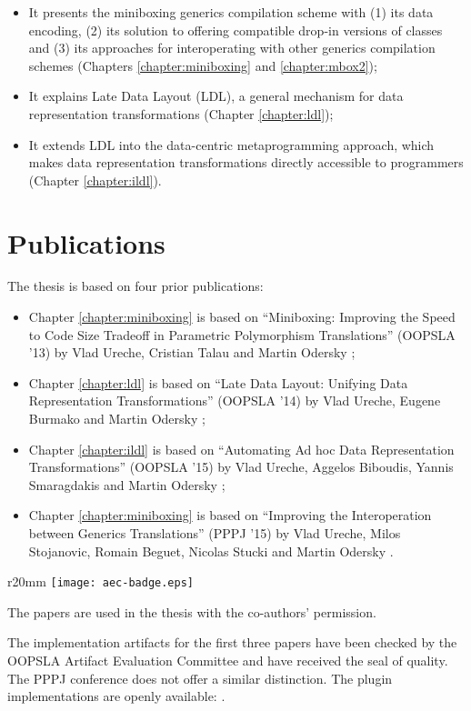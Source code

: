 \begin{itemize}
  \item It presents the miniboxing generics compilation scheme with (1) its data encoding, (2) its solution to offering compatible drop-in versions of classes and (3) its approaches for interoperating with other generics compilation schemes (Chapters \ref{chapter:miniboxing} and \ref{chapter:mbox2});
  \item It explains Late Data Layout (LDL), a general mechanism for data representation transformations (Chapter \ref{chapter:ldl});
  \item It extends LDL into the data-centric metaprogramming approach, which makes data representation transformations directly accessible to programmers (Chapter \ref{chapter:ildl}).
\end{itemize}

\section{Publications}

The thesis is based on four prior publications:

\begin{itemize}
  \item Chapter \ref{chapter:miniboxing} is based on ``Miniboxing: Improving the Speed to Code Size Tradeoff in Parametric Polymorphism Translations'' (OOPSLA '13) by Vlad Ureche, Cristian Talau and Martin Odersky \cite{miniboxing};
  \item Chapter \ref{chapter:ldl} is based on ``Late Data Layout: Unifying Data Representation Transformations'' (OOPSLA '14) by Vlad Ureche, Eugene Burmako and Martin Odersky \cite{ldl};
  \item Chapter \ref{chapter:ildl} is based on ``Automating Ad hoc Data Representation Transformations'' (OOPSLA '15) by Vlad Ureche, Aggelos Biboudis, Yannis Smaragdakis and Martin Odersky \cite{ildl-tech};
  \item Chapter \ref{chapter:miniboxing} is based on ``Improving the Interoperation between Generics Translations'' (PPPJ '15) by Vlad Ureche, Milos Stojanovic, Romain Beguet, Nicolas Stucki and Martin Odersky \cite{miniboxing-pppj}.
\end{itemize}

\begin{wrapfigure}{r}{20mm}
  \vspace{0.7em}
  \centering
  \texttt{[image: aec-badge.eps]}
  \vspace{-4em}
\end{wrapfigure}

The papers are used in the thesis with the co-authors' permission.

The implementation artifacts for the first three papers have been checked by the OOPSLA Artifact Evaluation Committee and have received the seal of quality. The PPPJ conference does not offer a similar distinction.
The plugin implementations are openly available: \cite{miniboxing-www,ildl-plugin,ldl-staging-plugin,ldl-value-class-plugin,miniboxing-plugin}.
